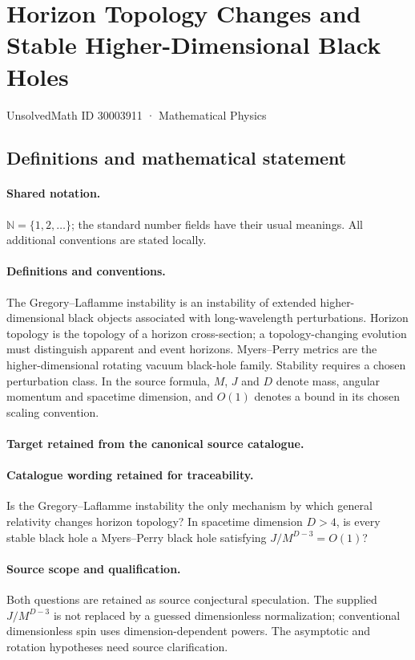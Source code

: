 \documentclass[11pt]{article}
\begin{document}
\setcounter{section}{30003910}
\section{Horizon Topology Changes and Stable Higher-Dimensional Black Holes}\label{30003911}
{\small UnsolvedMath ID 30003911 · Mathematical Physics}
\subsection{Definitions and mathematical statement}

\paragraph{Shared notation.}$\mathbb N=\{1,2,\ldots\}$; the standard number fields have their usual meanings. All additional conventions are stated locally.


\paragraph{Definitions and conventions.}
The Gregory--Laflamme instability is an instability of extended higher-dimensional black objects associated with long-wavelength perturbations. Horizon topology is the topology of a horizon cross-section; a topology-changing evolution must distinguish apparent and event horizons. Myers--Perry metrics are the higher-dimensional rotating vacuum black-hole family. Stability requires a chosen perturbation class. In the source formula, $M$, $J$ and $D$ denote mass, angular momentum and spacetime dimension, and $O(1)$ denotes a bound in its chosen scaling convention.

\paragraph{Target retained from the canonical source catalogue.}
\paragraph{Catalogue wording retained for traceability.}
Is the Gregory–Laflamme instability the only mechanism by which general relativity changes horizon topology? In spacetime dimension $D>4$, is every stable black hole a Myers–Perry black hole satisfying $J/M^{D-3}=O(1)$?

\paragraph{Source scope and qualification.}
Both questions are retained as source conjectural speculation. The supplied $J/M^{D-3}$ is not replaced by a guessed dimensionless normalization; conventional dimensionless spin uses dimension-dependent powers. The asymptotic and rotation hypotheses need source clarification.
\end{document}
